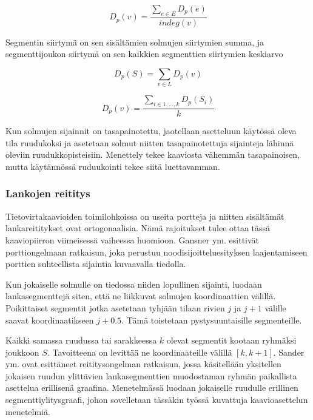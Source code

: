 \documentclass[finnish,12pt]{article}
\begin{document}
 \begin{equation}
 	D_p(v)=\frac{\sum_{e \in E}D_p(e)}{indeg(v)}
\end{equation}

Segmentin siirtymä on sen sisältämien solmujen siirtymien summa, ja segmenttijoukon siirtymä on sen kaikkien segmenttien siirtymien keskiarvo

\begin{equation}
	D_p(S)=\sum_{v \in L} D_p(v)
\end{equation}

\begin{equation}
	D_p(v)=\frac{\sum_{i \in {1,...,k}}D_p(S_i)}{k}
\end{equation}


Kun solmujen sijainnit on tasapainotettu, jaotellaan asetteluun käytössä oleva tila ruudukoksi ja asetetaan solmut niitten tasapainotettuja sijainteja lähinnä oleviin ruudukkopisteisiin.
Menettely tekee kaaviosta vähemmän tasapainoisen, mutta käytännössä ruduukointi tekee siitä luettavamman.

		\subsubsection{Lankojen reititys}

Tietovirtakaavioiden toimilohkoissa on useita portteja ja niitten sisältämät lankareititykset ovat ortogonaalisia.
Nämä rajoitukset tulee ottaa tässä kaaviopiirron viimeisessä vaiheessa huomioon.
Gansner ym. esittivät porttiongelmaan ratkaisun, joka perustuu noodisijoitteluesityksen laajentamiseen porttien suhteellista sijaintia kuvaavalla tiedolla.\cite{RefWorks:28}

Kun jokaiselle solmulle on tiedossa niiden lopullinen sijainti, luodaan lankasegmenttejä siten, että ne liikkuvat solmujen koordinaattien välillä.
Poikittaiset segmentit jotka asetetaan tyhjään tilaan rivien $j$ ja $j+1$ välille saavat koordinaatikseen $j+0.5$.
Tämä toistetaan pystysuuntaisille segmenteille.

Kaikki samassa ruudussa tai sarakkeessa $k$ olevat segmentit kootaan ryhmäksi joukkoon $S$.
Tavoitteena on levittää ne koordinaateille välillä $[k, k+1]$.
Sander ym. ovat esittäneet reititysongelman ratkaisun, jossa käsitellään yksitellen jokaisen ruudun ylittävien lankasegmenttien muodostaman ryhmän paikallista asettelua erillisenä graafina. \cite{RefWorks:17}
Menetelmässä luodaan jokaiselle ruudulle erillinen segmenttiylitysgraafi, johon sovelletaan tässäkin työssä kuvattuja kaavioasettelun menetelmiä.
\end{document}

